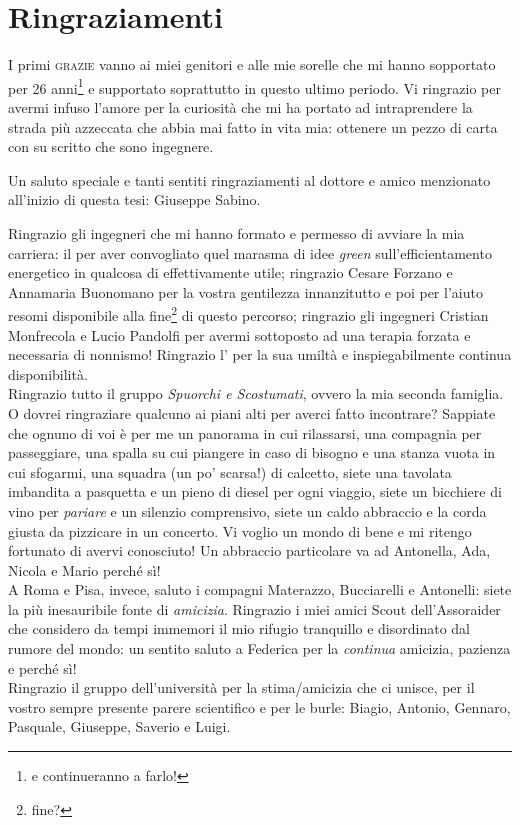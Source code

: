 \chapter*{Ringraziamenti}
\thispagestyle{empty}
I primi \textsc{grazie} vanno ai miei genitori e alle mie sorelle che mi hanno sopportato per 26 anni\footnote{e continueranno a farlo!} e supportato soprattutto in questo ultimo periodo. Vi ringrazio per avermi infuso l'amore per la curiosità che mi ha portato ad intraprendere la strada più azzeccata che abbia mai fatto in vita mia: ottenere un pezzo di carta con su scritto che sono ingegnere.

Un saluto speciale e tanti sentiti ringraziamenti al dottore e amico menzionato all'inizio di questa tesi: Giuseppe Sabino.

Ringrazio gli ingegneri che mi hanno formato e permesso di avviare la mia carriera: il  per aver convogliato quel marasma di idee \emph{green} sull'efficientamento energetico in qualcosa di effettivamente utile;
ringrazio Cesare Forzano e Annamaria Buonomano per la vostra gentilezza innanzitutto e poi per l'aiuto resomi disponibile alla fine\footnote{fine?} di questo percorso;
ringrazio gli ingegneri Cristian Monfrecola e Lucio Pandolfi per avermi sottoposto ad una terapia forzata e necessaria di nonnismo!
Ringrazio l' per la sua umiltà e inspiegabilmente continua disponibilità.\\
Ringrazio tutto il gruppo \emph{Spuorchi e Scostumati}, ovvero la mia seconda famiglia. O dovrei ringraziare qualcuno ai piani alti per averci fatto incontrare? Sappiate che ognuno di voi è per me un panorama in cui rilassarsi, una compagnia per passeggiare, una spalla su cui piangere in caso di bisogno e una stanza vuota in cui sfogarmi, una squadra (un po' scarsa!) di calcetto, siete una tavolata imbandita a pasquetta e un pieno di diesel per ogni viaggio, siete un bicchiere di vino per \emph{pariare} e un silenzio comprensivo, siete un caldo abbraccio e la corda giusta da pizzicare in un concerto. Vi voglio un mondo di bene e mi ritengo fortunato di avervi conosciuto! Un abbraccio particolare va ad Antonella, Ada, Nicola e Mario perché sì!\\
A Roma e Pisa, invece, saluto i compagni Materazzo, Bucciarelli e Antonelli: siete la più inesauribile fonte di \emph{amicizia}.
\newpage
\thispagestyle{empty}
Ringrazio i miei amici Scout dell'Assoraider che considero da tempi immemori il mio rifugio tranquillo e disordinato dal rumore del mondo: un sentito saluto a Federica per la \emph{continua} amicizia, pazienza e perché sì!\\Ringrazio il gruppo dell'università per la stima/amicizia che ci unisce, per il vostro sempre presente parere scientifico e per le burle: Biagio, Antonio, Gennaro, Pasquale, Giuseppe, Saverio e Luigi.\\
